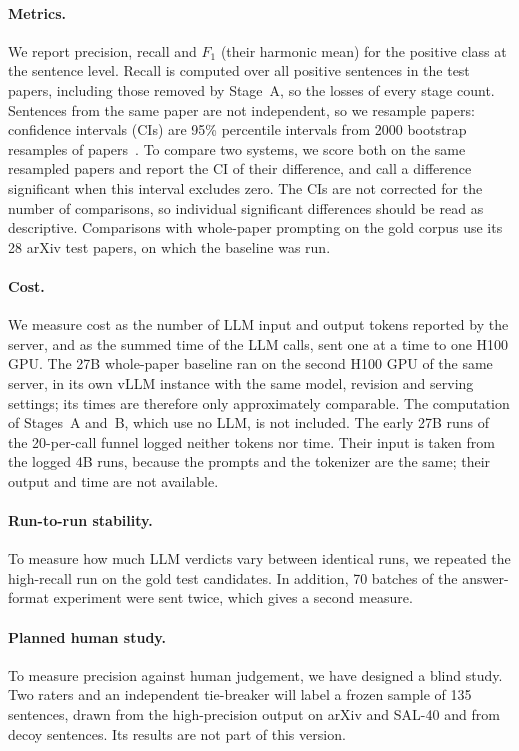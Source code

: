 \paragraph{Metrics.} We report precision, recall and $F_1$ (their harmonic mean) for the positive class at the sentence level. Recall is computed over all positive sentences in the test papers, including those removed by Stage~A, so the losses of every stage count. Sentences from the same paper are not independent, so we resample papers: confidence intervals (CIs) are 95\% percentile intervals from 2000 bootstrap resamples of papers~\cite{efron1993bootstrap}. To compare two systems, we score both on the same resampled papers and report the CI of their difference, and call a difference significant when this interval excludes zero. The CIs are not corrected for the number of comparisons, so individual significant differences should be read as descriptive. Comparisons with whole-paper prompting on the gold corpus use its 28 arXiv test papers, on which the baseline was run.

\paragraph{Cost.} We measure cost as the number of LLM input and output tokens reported by the server, and as the summed time of the LLM calls, sent one at a time to one H100 GPU. The 27B whole-paper baseline ran on the second H100 GPU of the same server, in its own vLLM instance with the same model, revision and serving settings; its times are therefore only approximately comparable. The computation of Stages~A and~B, which use no LLM, is not included. The early 27B runs of the 20-per-call funnel logged neither tokens nor time. Their input is taken from the logged 4B runs, because the prompts and the tokenizer are the same; their output and time are not available.

\paragraph{Run-to-run stability.} To measure how much LLM verdicts vary between identical runs, we repeated the high-recall run on the gold test candidates. In addition, 70 batches of the answer-format experiment were sent twice, which gives a second measure.

\paragraph{Planned human study.} To measure precision against human judgement, we have designed a blind study. Two raters and an independent tie-breaker will label a frozen sample of 135 sentences, drawn from the high-precision output on arXiv and SAL-40 and from decoy sentences. Its results are not part of this version.

